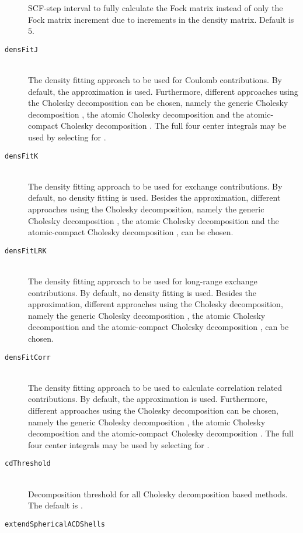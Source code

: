 \begin{description}
    SCF-step interval to fully calculate the Fock matrix instead of only the Fock matrix increment due to increments in the density matrix. Default is $5$.
    \item [\texttt{densFitJ}]\hfill \\
    The density fitting approach to be used for Coulomb contributions. By default, the  approximation is used. Furthermore, different approaches using the Cholesky decomposition can be chosen, namely the generic Cholesky decomposition , the atomic Cholesky decomposition  and the atomic-compact Cholesky decomposition . The full four center integrals may be used by selecting  for .
    \item [\texttt{densFitK}]\hfill \\
    The density fitting approach to be used for exchange contributions. By default, no density fitting is used. Besides the  approximation, different approaches using the Cholesky decomposition, namely the generic Cholesky decomposition , the atomic Cholesky decomposition  and the atomic-compact Cholesky decomposition , can be chosen.
    \item [\texttt{densFitLRK}]\hfill \\
    The density fitting approach to be used for long-range exchange contributions. By default, no density fitting is used. Besides the  approximation, different approaches using the Cholesky decomposition, namely the generic Cholesky decomposition , the atomic Cholesky decomposition  and the atomic-compact Cholesky decomposition , can be chosen.
    \item [\texttt{densFitCorr}]\hfill \\
    The density fitting approach to be used to calculate correlation related contributions. By default, the  approximation is used. Furthermore, different approaches using the Cholesky decomposition can be chosen, namely the generic Cholesky decomposition , the atomic Cholesky decomposition  and the atomic-compact Cholesky decomposition . The full four center integrals may be used by selecting  for .
    \item [\texttt{cdThreshold}]\hfill\\
    Decomposition threshold for all Cholesky decomposition based methods. The default is .
    \item [\texttt{extendSphericalACDShells}]\hfill\\

\end{description}
